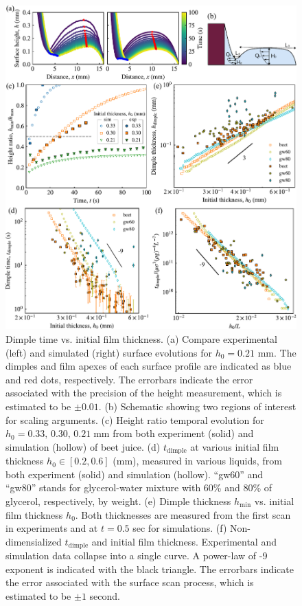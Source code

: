 \documentclass[aps,prfluids,amsmath,amssymb,superscriptaddress,longbibliography]{revtex4-2}
\newif\ifhighlight
\newcommand{\hl}[1]{\ifhighlight\textcolor{blue}{#1}\else#1\fi}
\begin{document}
\begin{figure}
    \centering
    \includegraphics[width=.8\linewidth]{dimple_time_simulation}
    \caption{
    \hl{Dimple time vs. initial film thickness.} 
    (a) Compare experimental (left) and simulated (right) surface evolutions for $h_0=0.21$ mm. The dimples and film apexes of each surface profile are indicated as blue and red dots, respectively.
    \hl{The errorbars indicate the error associated with the precision of the height measurement, which is estimated to be $\pm 0.01$.}
    \hl{(b) Schematic showing two regions of interest for scaling arguments. 
    (c) Height ratio temporal evolution for $h_0=0.33,\,0.30,\,0.21\;\mathrm{mm}$ from both experiment (solid) and simulation (hollow) of beet juice. 
    (d) $t_{\mathrm{dimple}}$ at various initial film thickness $h_0\in[0.2,0.6]$ (mm), measured in various liquids, from both experiment (solid) and simulation (hollow).
    ``gw60'' and ``gw80'' stands for glycerol-water mixture with 60\% and 80\% of glycerol, respectively, by weight. 
    (e) Dimple thickness $h_\mathrm{min}$ vs. initial film thickness $h_0$. Both thicknesses are measured from the first scan in experiments and at $t=0.5$ sec for simulations.} 
    \hl{(f) Non-dimensialized $t_{\mathrm{dimple}}$ and initial film thickness. Experimental and simulation data collapse into a single curve. 
    A power-law of -9 exponent is indicated with the black triangle.
    The errorbars indicate the error associated with the surface scan process, which is estimated to be $\pm 1$ second. } }
    \label{fig:simulation}
\end{figure}
\end{document}

